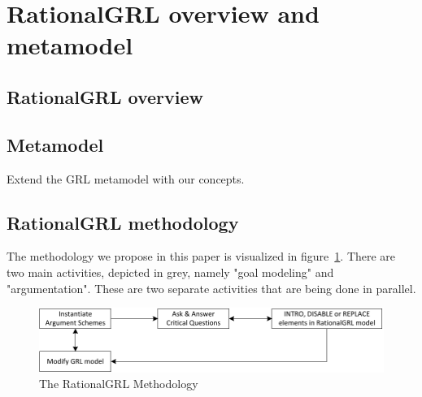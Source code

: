 \section{RationalGRL overview and metamodel}
\label{sect:preview}


\subsection{RationalGRL overview}


\subsection{Metamodel}

Extend the GRL metamodel with our concepts.

\subsection{RationalGRL methodology}


The methodology we propose in this paper is visualized in figure~\ref{fig:rationalgrl-methodology}. There are two main activities, depicted in grey, namely "goal modeling" and "argumentation". These are two separate activities that are being done in parallel. 

\begin{figure}[ht]
\centering
\includegraphics[scale=0.4]{img/methodology}
\caption{The RationalGRL Methodology}
\label{fig:rationalgrl-methodology}
\end{figure}
